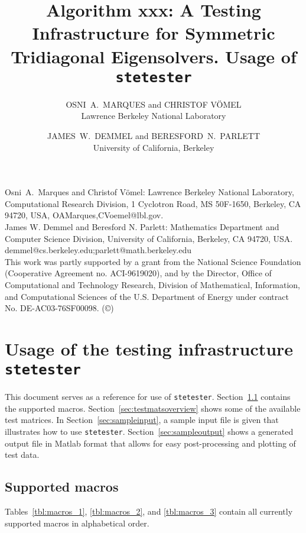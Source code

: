\documentclass[acmtoms]{acmtrans2m}
\title{Algorithm xxx: A Testing Infrastructure for Symmetric Tridiagonal
  Eigensolvers. Usage of {\tt stetester}}
\author{
OSNI~A.~MARQUES
and
CHRISTOF V\"OMEL \\Lawrence Berkeley National Laboratory
\and
JAMES~W.~DEMMEL
and 
BERESFORD~N.~PARLETT \\University of California, Berkeley
}
\begin{document}
\setcounter{page}{1}

\begin{bottomstuff}
Osni~A.~Marques and Christof V\"omel:
Lawrence Berkeley National Laboratory, 
Computational Research Division, 1 Cyclotron
Road, MS 50F-1650, Berkeley, CA 94720, USA, {OAMarques,CVoemel}@lbl.gov.\\
James W. Demmel and Beresford N. Parlett:
Mathematics Department and Computer Science Division,
University of California, Berkeley, CA 94720, USA. 
demmel@cs.berkeley.edu;parlett@math.berkeley.edu\\
This work was partly supported by a grant from the
National Science Foundation (Cooperative Agreement no. ACI-9619020), 
and by the Director, Office of Computational and Technology Research, 
Division of Mathematical, Information, and Computational Sciences of 
the U.S. Department of Energy under contract No. DE-AC03-76SF00098.
(\copyright)
\end{bottomstuff}

\maketitle


\section{Usage of the testing infrastructure {\tt stetester}} 
\label{sec:appendix}

This document serves as a reference for use of  {\tt stetester}.
Section~\ref{sec:stetestermacros} contains the supported macros.
Section~\ref{sec:testmatsoverview} shows some of the available test
matrices.
In Section~\ref{sec:sampleinput}, a sample input file is given
that illustrates how to use {\tt stetester}. Section~\ref{sec:sampleoutput}
shows a generated output file in Matlab format 
that allows for easy post-processing and plotting of test data.

\subsection{Supported macros} 
\label{sec:stetestermacros}

Tables~\ref{tbl:macros_1},
\ref{tbl:macros_2}, and \ref{tbl:macros_3}
contain all currently supported macros in alphabetical order. 
\end{document}
